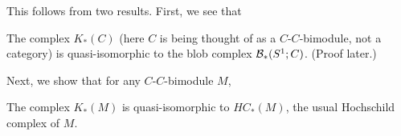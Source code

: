 
This follows from two results. First, we see that
\begin{lem}
\label{lem:module-blob}%
The complex $K_*(C)$ (here $C$ is being thought of as a
$C$-$C$-bimodule, not a category) is quasi-isomorphic to the blob complex
${\mathcal B}_*(S^1; C)$. (Proof later.)
\end{lem}

Next, we show that for any $C$-$C$-bimodule $M$,
\begin{prop}
The complex $K_*(M)$ is quasi-isomorphic to $HC_*(M)$, the usual
Hochschild complex of $M$.
\end{prop}
